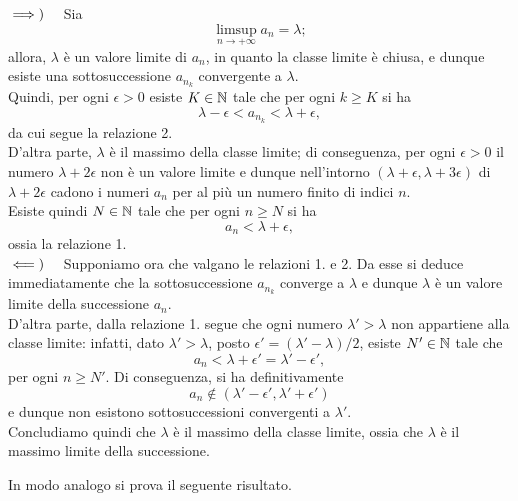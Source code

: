 \begin{demonstrationcaput}
	$\implies)\quad$  Sia 
	\begin{equation*}
		\limsup_{n\to +\infty} a_n =\lambda;
	\end{equation*}
	allora, $\lambda$ è un valore limite di $a_n$, in quanto la classe limite è chiusa, e dunque esiste una sottosuccessione $a_{n_k}$ convergente a $\lambda$.\\
	Quindi, per ogni $\epsilon >0$ esiste $K\in \mathbb{N}$ tale che per ogni $k\geq K$ si ha
	\begin{equation*}
		\lambda-\epsilon < a_{n_k} <\lambda +\epsilon,
	\end{equation*}
	da cui segue la relazione 2.\\ 
	D'altra parte, $\lambda$ è il massimo della classe limite; di conseguenza, per ogni $\epsilon > 0$ il numero $\lambda +2\epsilon$ non è un valore limite e dunque nell'intorno $(\lambda +\epsilon, \lambda +3\epsilon)$ di $\lambda +2\epsilon$ cadono i numeri $a_n$ per al più un numero finito di indici $n$.\\
	Esiste quindi $N\in \mathbb{N}$ tale che per ogni $n\geq N$ si ha 
	\begin{equation*}
		a_n <\lambda +\epsilon,
	\end{equation*}
	ossia la relazione 1.\\
	$\impliedby)\quad$ Supponiamo ora che valgano le relazioni 1. e 2. Da esse si deduce immediatamente che la sottosuccessione $a_{n_k}$ converge a $\lambda$ e dunque $\lambda$ è un valore limite della successione $a_n$.\\
	D'altra parte, dalla relazione 1. segue che ogni numero $\lambda '>\lambda$ non appartiene alla classe limite: infatti, dato  $\lambda '>\lambda$, posto $\epsilon' = (\lambda'-\lambda)/2$, esiste $N'\in \mathbb{N}$ tale che
	\begin{equation*}
		a_n< \lambda +\epsilon' = \lambda'-\epsilon ',
	\end{equation*}
	per ogni $n\geq N'$. Di conseguenza, si ha definitivamente
	\begin{equation*}
		a_n \notin (\lambda' -\epsilon',\lambda'+\epsilon')
	\end{equation*}
	e dunque non esistono sottosuccessioni convergenti a $\lambda'$.\\
	Concludiamo quindi che $\lambda$ è il massimo della classe limite, ossia che $\lambda$ è il massimo limite della successione.
\end{demonstrationcaput}
In modo analogo si prova il seguente risultato.

